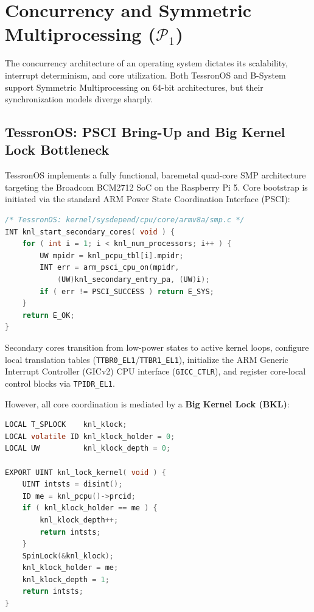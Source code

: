 \documentclass[10pt,journal,compsoc,twocolumn]{article}
\begin{document}
\section{Concurrency and Symmetric Multiprocessing ($\mathcal{P}_1$)}
\label{sec:smp}

The concurrency architecture of an operating system dictates its scalability, interrupt determinism, and core utilization. Both TessronOS and B-System support Symmetric Multiprocessing on 64-bit architectures, but their synchronization models diverge sharply.

\subsection{TessronOS: PSCI Bring-Up and Big Kernel Lock Bottleneck}
TessronOS implements a fully functional, baremetal quad-core SMP architecture targeting the Broadcom BCM2712 SoC on the Raspberry Pi 5. Core bootstrap is initiated via the standard ARM Power State Coordination Interface (PSCI):
\begin{lstlisting}[language=C]
/* TessronOS: kernel/sysdepend/cpu/core/armv8a/smp.c */
INT knl_start_secondary_cores( void ) {
    for ( int i = 1; i < knl_num_processors; i++ ) {
        UW mpidr = knl_pcpu_tbl[i].mpidr;
        INT err = arm_psci_cpu_on(mpidr, 
            (UW)knl_secondary_entry_pa, (UW)i);
        if ( err != PSCI_SUCCESS ) return E_SYS;
    }
    return E_OK;
}
\end{lstlisting}
Secondary cores transition from low-power states to active kernel loops, configure local translation tables (\texttt{TTBR0\_EL1}/\texttt{TTBR1\_EL1}), initialize the ARM Generic Interrupt Controller (GICv2) CPU interface (\texttt{GICC\_CTLR}), and register core-local control blocks via \texttt{TPIDR\_EL1}.

However, all core coordination is mediated by a \textbf{Big Kernel Lock (BKL)}:
\begin{lstlisting}[language=C]
LOCAL T_SPLOCK    knl_klock;
LOCAL volatile ID knl_klock_holder = 0;
LOCAL UW          knl_klock_depth = 0;

EXPORT UINT knl_lock_kernel( void ) {
    UINT intsts = disint();
    ID me = knl_pcpu()->prcid;
    if ( knl_klock_holder == me ) {
        knl_klock_depth++;
        return intsts;
    }
    SpinLock(&knl_klock);
    knl_klock_holder = me;
    knl_klock_depth = 1;
    return intsts;
}
\end{lstlisting}
\end{document}

